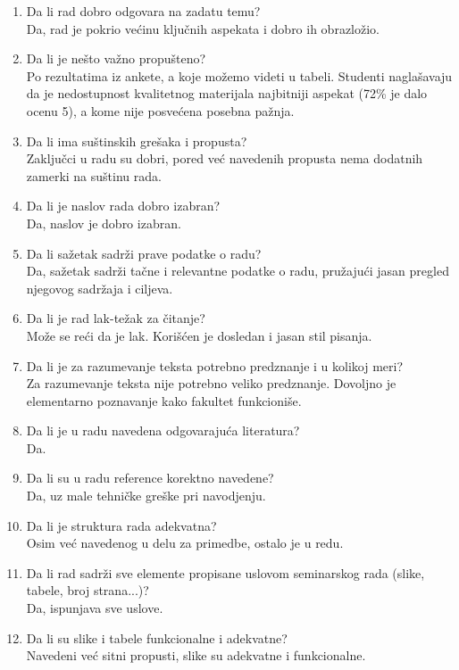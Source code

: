 \documentclass[a4paper]{report}
\begin{document}
\begin{enumerate}
\item Da li rad dobro odgovara na zadatu temu?\\
Da, rad je pokrio većinu ključnih aspekata i dobro ih obrazložio. 
\item Da li je nešto važno propušteno?\\
Po rezultatima iz ankete, a koje možemo videti u tabeli. Studenti naglašavaju da je nedostupnost kvalitetnog materijala najbitniji aspekat (72\% je dalo ocenu 5), a kome nije posvećena posebna pažnja. 
\item Da li ima suštinskih grešaka i propusta?\\
Zaključci u radu su dobri, pored već navedenih propusta nema dodatnih zamerki na suštinu rada.
\item Da li je naslov rada dobro izabran?\\
Da, naslov je dobro izabran.
\item Da li sažetak sadrži prave podatke o radu?\\
Da, sažetak sadrži tačne i relevantne podatke o radu, pružajući jasan pregled njegovog sadržaja i ciljeva.
\item Da li je rad lak-težak za čitanje?\\
Može se reći da je lak. Korišćen je dosledan i jasan stil pisanja.
\item Da li je za razumevanje teksta potrebno predznanje i u kolikoj meri?\\
Za razumevanje teksta nije potrebno veliko predznanje. Dovoljno je elementarno poznavanje kako fakultet funkcioniše.
\item Da li je u radu navedena odgovarajuća literatura?\\
Da.
\item Da li su u radu reference korektno navedene?\\
Da, uz male tehničke greške pri navodjenju.
\item Da li je struktura rada adekvatna?\\
Osim već navedenog u delu za primedbe, ostalo je u redu.
\item Da li rad sadrži sve elemente propisane uslovom seminarskog rada (slike, tabele, broj strana...)?\\
Da, ispunjava sve uslove.
\item Da li su slike i tabele funkcionalne i adekvatne?\\
Navedeni već sitni propusti, slike su adekvatne i funkcionalne.
\end{enumerate}
\end{document}

